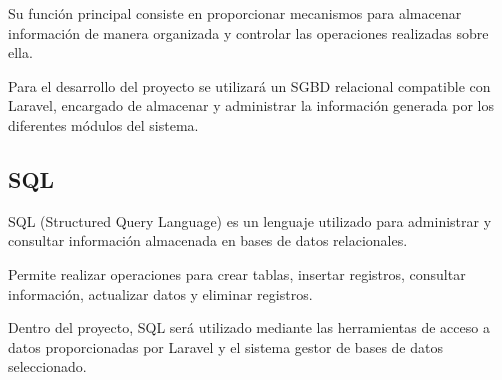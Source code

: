 Su función principal consiste en proporcionar mecanismos para almacenar información de manera organizada y controlar las operaciones realizadas sobre ella.

Para el desarrollo del proyecto se utilizará un SGBD relacional compatible con Laravel, encargado de almacenar y administrar la información generada por los diferentes módulos del sistema.

\subsection{SQL}

SQL (Structured Query Language) es un lenguaje utilizado para administrar y consultar información almacenada en bases de datos relacionales.

Permite realizar operaciones para crear tablas, insertar registros, consultar información, actualizar datos y eliminar registros.

Dentro del proyecto, SQL será utilizado mediante las herramientas de acceso a datos proporcionadas por Laravel y el sistema gestor de bases de datos seleccionado.

